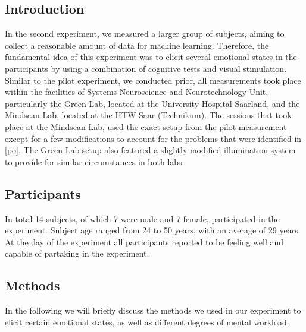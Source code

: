\subsection{Introduction}
In the second experiment, we measured a larger group of subjects, aiming to collect a reasonable amount of data for machine learning. Therefore, the fundamental idea of this experiment was to elicit several emotional states in the participants by using a combination of cognitive tests and visual stimulation.  
Similar to the pilot experiment, we conducted prior, all measurements took place within the facilities of Systems Neuroscience and Neurotechnology Unit, particularly the Green Lab, located at the University Hospital Saarland, and the Mindscan Lab, located at the HTW Saar (Technikum). The sessions that took place at the Mindscan Lab, used the exact setup from the pilot measurement except for a few modifications to account for the problems that were identified in \ref{po}. The Green Lab setup also featured a slightly modified illumination system to provide for similar circumstances in both labs.
 
\subsection{Participants}\label{exppar}
In total 14 subjects, of which 7 were male and 7 female, participated in the experiment. Subject age ranged from 24 to 50 years, with an average of 29 years. At the day of the experiment all participants reported to be feeling well and capable of partaking in the experiment. 
\subsection{Methods}
In the following we will briefly discuss the methods we used in our experiment to elicit certain emotional states, as well as different degrees of mental workload.

